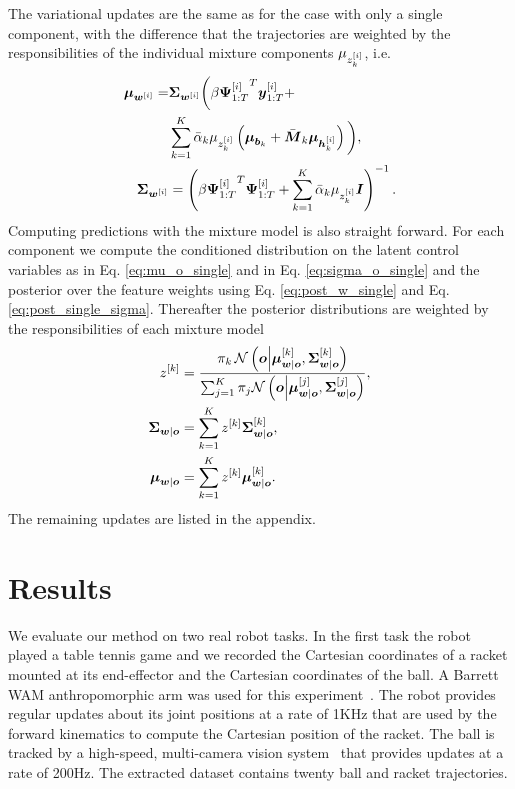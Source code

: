 The variational updates are the same as for the case with only a single component, with 
the  difference that the trajectories are weighted by the responsibilities of the individual mixture components $\mu_{z^{[i]}_k}$, i.e.
\begin{align*}
    \boldsymbol{\mu}_{\boldsymbol{w}^{[i]}}  =& \boldsymbol{\Sigma}_{\boldsymbol{w}^{[i]}}  \bigg( \beta {\ensuremath{\boldsymbol{\Psi}}_{1:T}^{[i]}}^T \boldsymbol{y}_{1:T}^{[i]} + \\
         & \sum_{k=1}^K \bar{\alpha}_k  \mu_{z^{[i]}_k} \left(\boldsymbol{\mu}_{\boldsymbol{b}_k}  + \bar{\boldsymbol{M}}_k  \boldsymbol{\mu}_{\boldsymbol{h}^{[i]}_k} \right)\bigg), \\
 \boldsymbol{\Sigma}_{\boldsymbol{w}^{[i]}}  &= \left(\beta {\ensuremath{\boldsymbol{\Psi}}_{1:T}^{[i]}}^T \boldsymbol{\Psi}_{1:T}^{[i]} +
\sum_{k=1}^K \bar{\alpha}_k  \mu_{z^{[i]}_k} \boldsymbol{I}\right)^{-1}. 
\end{align*}
Computing predictions with the mixture model is also straight forward. 
For each component we compute the conditioned distribution on the latent control variables 
as in Eq. \eqref{eq:mu_o_single} and in Eq. \eqref{eq:sigma_o_single} and 
the posterior over the feature weights using Eq. \eqref{eq:post_w_single} and Eq. \eqref{eq:post_single_sigma}.
Thereafter the posterior distributions are weighted
by the responsibilities of each mixture model   
\begin{align*}
z^{[k]} &= \frac{\pi_k \, \mathcal{N}\left(\boldsymbol{o}\middle|\boldsymbol{{\mu}}_{\boldsymbol{w} |
\boldsymbol{o}}^{[k]}, \boldsymbol{{\Sigma}}_{\boldsymbol{w} |\boldsymbol{o}}^{[k]}\right)}{\sum_{j=1}^K
\pi_j\mathcal{N}\left(\boldsymbol{o}\middle|\boldsymbol{{\mu}}_{\boldsymbol{w} | \boldsymbol{o}}^{[j]},
\boldsymbol{{\Sigma}}_{\boldsymbol{w} |\boldsymbol{o}}^{[j]}\right)}, \\
\boldsymbol{\Sigma}_{\boldsymbol{w} |\boldsymbol{o}} &= \sum_{k=1}^K z^{[k]} \boldsymbol{{\Sigma}}_{\boldsymbol{w} |\boldsymbol{o}}^{[k]}, \\
\boldsymbol{\mu}_{\boldsymbol{w} | \boldsymbol{o}} &= \sum_{k=1}^K z^{[k]} \boldsymbol{{\mu}}_{\boldsymbol{w} | \boldsymbol{o}}^{[k]}. 
\end{align*}
The remaining updates are listed in the appendix. 






\section{Results}

We evaluate our method on two real robot tasks. In the first task the robot
played a table tennis game and we recorded the Cartesian coordinates of a
racket mounted at its end-effector and the Cartesian coordinates of the ball. 
A Barrett WAM anthropomorphic arm was used for this experiment~\cite{Muelling2011}. 
The robot provides regular updates about its
joint positions at a rate of 1KHz that are used by the forward kinematics to
compute the Cartesian position of the racket. The ball is tracked by a
high-speed, multi-camera vision system~\cite{Lampert2012} that provides updates
at a rate of 200Hz. The extracted dataset contains twenty ball and racket
trajectories. 

